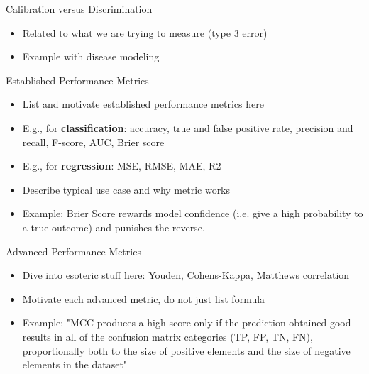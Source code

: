 \documentclass[11pt,compress,t,notes=noshow, aspectratio=169, xcolor=table]{beamer}
\begin{document}
\begin{frame}{Calibration versus Discrimination}

\begin{itemize}
\setlength\itemsep{2em}
    \item Related to what we are trying to measure (type 3 error)
    \item Example with disease modeling
\end{itemize}

\end{frame}

\begin{frame}{Established Performance Metrics}

\begin{itemize}
\setlength\itemsep{2em}
    \item List and motivate established performance metrics here
    \item E.g., for \textbf{classification}: accuracy, true and false positive rate, precision and recall, F-score, AUC, Brier score
    \item E.g., for \textbf{regression}: MSE, RMSE, MAE, R2
    \item Describe typical use case and why metric works
    \item Example: Brier Score rewards model confidence (i.e. give a high probability to a true outcome) and punishes the reverse.
\end{itemize}
\end{frame}

\begin{frame}{Advanced Performance Metrics}

\begin{itemize}
\setlength\itemsep{2em}
    \item Dive into esoteric stuff here: Youden, Cohens-Kappa, Matthews correlation
    \item Motivate each advanced metric, do not just list formula
    \item Example: "MCC produces a high score only if the prediction obtained good results in all of the confusion matrix categories (TP, FP, TN, FN), proportionally both to the size of positive elements and the size of negative elements in the dataset"
\end{itemize}
\end{frame}


\end{document}
